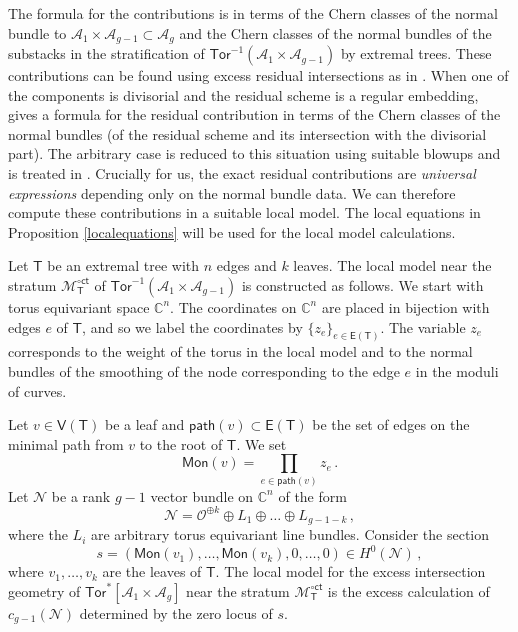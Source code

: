 \documentclass[11pt]{amsart}
\theoremstyle{definition}
\newcommand{\N}{\mathcal{N}}
\newcommand{\cc}{\mathbb{C}}
\newcommand{\M}{\mathcal{M}}
\newcommand{\A}{\mathcal{A}}
\renewcommand{\O}{\mathcal{O}}
\DeclareMathOperator{\ct}{ct}
\newcommand{\Tor}{\mathsf{Tor}}
\begin{document}
{%

The formula for the contributions is in terms of the Chern classes of the normal bundle to $\A_1\times \A_{g-1}\subset \A_g$ and the Chern classes of the normal bundles of the substacks in the stratification of $\Tor^{-1}(\A_1\times \A_{g-1})$ by extremal trees. These contributions can be found using excess residual intersections as in \cite[Chapter IX]{Fulton}. When one of the components is divisorial and the residual scheme is a regular embedding, \cite[Corollary 9.2.1]{Fulton} gives a formula for the residual contribution in terms of the Chern classes of the normal bundles (of the residual scheme and its intersection with the divisorial part). The arbitrary case is reduced to this situation using suitable blowups and is treated in \cite[Corollary 9.2.3]{Fulton}. Crucially for us, the exact residual contributions are {\it universal expressions} depending only on the normal bundle data. We can therefore compute these contributions in a suitable local model. The local equations in Proposition \ref{localequations} will be used for the local model
calculations.

Let $\mathsf{T}$ be an extremal tree with $n$ edges and $k$ leaves. The local model near the
stratum 
$\mathcal{M}_\mathsf{T}^{\circ \mathsf{ct}}$
of $\Tor^{-1}(\A_1\times \A_{g-1})$
is constructed as follows. We start with torus equivariant space $\mathbb{C}^n$. The coordinates on $\mathbb{C}^n$ are placed in bijection with edges $e$ of $\mathsf{T}$, and so we label the coordinates by $\{z_e\}_{e\in \mathsf{E}(\mathsf{T})}$. The variable $z_e$ corresponds to the weight of the torus in the local model and to the normal bundles of the smoothing of the node corresponding to the edge $e$ in the moduli of curves. 



Let $v\in \mathsf{V}(\mathsf{T})$ be a leaf and $\mathsf{path}(v)\subset \mathsf{E}(\mathsf{T})$ be the set of edges on the minimal path from $v$ to the root of $\mathsf{T}$. We set 
\[
\mathsf{Mon}(v)=\prod_{e\in \mathsf{path}(v)} z_e\,.
\]
Let $\N$ be a rank $g-1$ vector bundle on $\cc^n$ of the form
\[
\N=\O^{\oplus k}\oplus L_1\oplus \dots \oplus L_{g-1-k}\,,
\]
where the $L_i$ are arbitrary torus equivariant line bundles. Consider the section 
\[
s=(\mathsf{Mon}(v_1),\dots,\mathsf{Mon}(v_k),0,\dots,0)\in H^0(\N)\,,
\]
where $v_1,\dots,v_k$ are the leaves of $\mathsf{T}$. 
The local model for the excess intersection
geometry of  
$\Tor^*[\A_1\times \A_g]$ near 
the stratum 
$\mathcal{M}_\mathsf{T}^{\circ \mathsf{ct}}$
is the excess calculation of 
$c_{g-1}(\mathcal{N})$ determined by the zero locus of $s$. 

}
\end{document}
